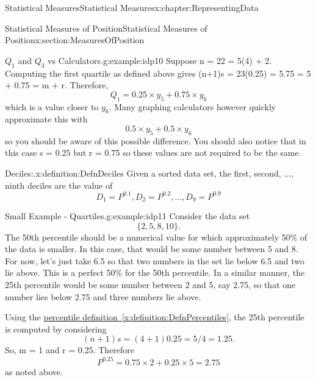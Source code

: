 \documentclass[oneside,10pt,]{book}
\newcommand{\xreffont}{\relax}
\numberwithin{equation}{section}
\begin{document}
\begin{chapterptx}{Statistical Measures}{}{Statistical Measures}{}{}{x:chapter:RepresentingData}
\begin{sectionptx}{Statistical Measures of Position}{}{Statistical Measures of Position}{}{}{x:section:MeasuresOfPosition}
\begin{example}{\(Q_1\) and \(Q_3\) vs Calculators.}{g:example:idp10}%
Suppose n = 22 = 5(4) + 2. Computing the first quartile as defined above gives (n+1)s = 23(0.25) = 5.75 = 5 + 0.75 = m + r.  Therefore,%
\begin{equation*}
Q_1 = 0.25 \times y_5 + 0.75 \times y_6
\end{equation*}
which is a value closer to \(y_6\).  Many graphing calculators however quickly approximate this with%
\begin{equation*}
0.5 \times y_5 + 0.5 \times y_6
\end{equation*}
so you should be aware of this possible difference.  You should also notice that in this case s = 0.25 but r = 0.75 so these values are not required to be the same.%
\end{example}
\begin{definition}{Deciles:.}{x:definition:DefnDeciles}%
Given a sorted data set, the first, second, ..., ninth deciles are the value of%
\begin{equation*}
D_1 = P^{0.1}, D_2 = P^{0.2}, ... , D_9 = P^{0.9}
\end{equation*}
%
\end{definition}
\begin{example}{Small Example - Quartiles.}{g:example:idp11}%
Consider the data set%
\begin{equation*}
\{2, 5, 8, 10 \}.
\end{equation*}
The 50th percentile should be a numerical value for which approximately 50\% of the data is smaller. In this case, that would be some number between 5 and 8.  For now, let's just take 6.5 so that two numbers in the set lie below 6.5 and two lie above. This is a perfect 50\% for the 50th percentile. In a similar manner, the 25th percentile would be some number between 2 and 5, say 2.75, so that one number lies below 2.75 and three numbers lie above.%
\par
Using the \hyperref[x:definition:DefnPercentiles]{percentile definition~{\xreffont\ref{x:definition:DefnPercentiles}}}, the 25th percentile is computed by considering%
\begin{equation*}
(n+1)s = (4+1)0.25 = 5/4 = 1.25\text{.}
\end{equation*}
So, m = 1 and r = 0.25. Therefore%
\begin{equation*}
P^{0.25} = 0.75 \times 2 + 0.25 \times 5 = 2.75
\end{equation*}
as noted above.%
\par

\end{example}
\end{sectionptx}
\end{chapterptx}
\end{document}
